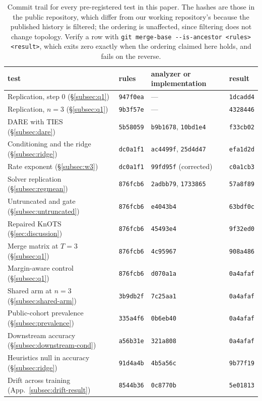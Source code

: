 \begin{table}[tb]
\centering
\small
\caption{Commit trail for every pre-registered test in this paper. The hashes
are those in the public repository, which differ from our working
repository's because the published history is filtered; the ordering is
unaffected, since filtering does not change topology. Verify a row
with \texttt{git merge-base -{}-is-ancestor <rules> <result>}, which exits zero
exactly when the ordering claimed here holds, and fails on the reverse.}
\label{tab:commits}
\begin{tabular}{llll}
\toprule
test & rules & analyzer or implementation & result \\
\midrule
Replication, step 0 (\S\ref{subsec:q1}) & \texttt{947f0ea} &
  --- & \texttt{1dcadd4} \\
Replication, $n=3$ (\S\ref{subsec:q1}) & \texttt{9b3f57e} &
  --- & \texttt{4328446} \\
DARE with TIES (\S\ref{subsec:dare}) & \texttt{5b58059} &
  \texttt{b9b1678}, \texttt{10bd1e4} & \texttt{f33cb02} \\
Conditioning and the ridge (\S\ref{subsec:ridge}) & \texttt{dc0a1f1} &
  \texttt{ac4499f}, \texttt{25d4d47} & \texttt{efa1d2d} \\
Rate exponent (\S\ref{subsec:w3}) & \texttt{dc0a1f1} &
  \texttt{99fd95f} (corrected) & \texttt{c0a1cb3} \\
\addlinespace
Solver replication (\S\ref{subsec:regmean}) & \texttt{876fcb6} &
  \texttt{2adbb79}, \texttt{1733865} & \texttt{57a8f89} \\
Untruncated and gate (\S\ref{subsec:untruncated}) & \texttt{876fcb6} &
  \texttt{e4043b4} & \texttt{63bdf0c} \\
Repaired KnOTS (\S\ref{sec:discussion}) & \texttt{876fcb6} &
  \texttt{45493e4} & \texttt{9f32ed0} \\
Merge matrix at $T=3$ (\S\ref{subsec:q1}) & \texttt{876fcb6} &
  \texttt{4c95967} & \texttt{908a486} \\
\addlinespace
Margin-aware control (\S\ref{subsec:q1}) & \texttt{876fcb6} &
  \texttt{d070a1a} & \texttt{0a4afaf} \\
Shared arm at $n=3$ (\S\ref{subsec:shared-arm}) & \texttt{3b9db2f} &
  \texttt{7c25aa1} & \texttt{0a4afaf} \\
Public-cohort prevalence (\S\ref{subsec:prevalence}) & \texttt{335a4f6} &
  \texttt{0b6eb40} & \texttt{0a4afaf} \\
Downstream accuracy (\S\ref{subsec:downstream-cond}) & \texttt{a56b31e} &
  \texttt{321a808} & \texttt{0a4afaf} \\
Heuristics null in accuracy (\S\ref{subsec:ridge}) & \texttt{91d4a4b} &
  \texttt{4b5a56c} & \texttt{9b77f19} \\
Drift across training (App.~\ref{subsec:drift-result}) & \texttt{8544b36} &
  \texttt{0c8770b} & \texttt{5e01813} \\
\bottomrule
\end{tabular}
\end{table}

